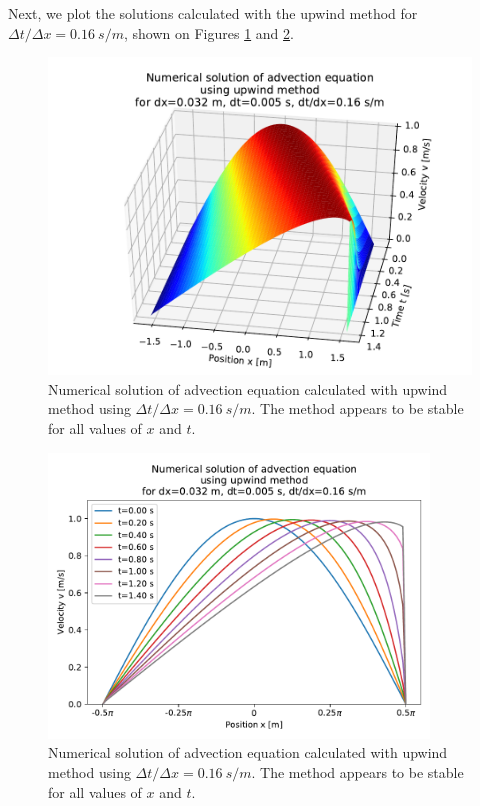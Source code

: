 Next, we plot the solutions calculated with the upwind method for $\Delta t / \Delta x = 0.16 \ s/m$, shown on Figures \ref{fig_upwind_nx_100_nt_281_3d} and \ref{fig_upwind_nx_100_nt_281_2d}.
\begin{figure}[H]
  \vspace*{-5mm}
  \centering
  \includegraphics[width=1.0\textwidth]{figures/numerical/upwind_nx_100_nt_281_3d.pdf}
  \vspace*{-10mm}
  \caption{Numerical solution of advection equation calculated with upwind method using $\Delta t / \Delta x = 0.16 \ s/m$. The method appears to be stable for all values of $x$ and $t$.}
  \label{fig_upwind_nx_100_nt_281_3d}
  \vspace*{-10mm}
\end{figure}
\begin{figure}[H]
  \centering
  \includegraphics[width=0.9\textwidth]{figures/numerical/upwind_nx_100_nt_281_2d.pdf}
  \vspace*{-5mm}
  \caption{Numerical solution of advection equation calculated with upwind method using $\Delta t / \Delta x = 0.16 \ s/m$. The method appears to be stable for all values of $x$ and $t$.}
  \label{fig_upwind_nx_100_nt_281_2d}
  \vspace*{-10mm}
\end{figure}

